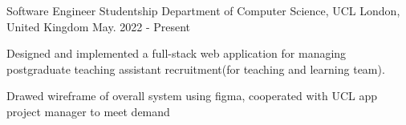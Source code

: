 

\begin{cventries}

  \cventry
    {Software Engineer Studentship} %
    {Department of Computer Science, UCL } %
    {London, United Kingdom} %
    {May. 2022 - Present} %
    {
      \begin{cvitems} %
        \item {Designed and implemented a full-stack web application for managing postgraduate teaching assistant recruitment(for teaching and learning team).}
        \item {Drawed wireframe of overall system using figma, cooperated with UCL app project manager to meet demand}
      \end{cvitems}
    }


\end{cventries}
